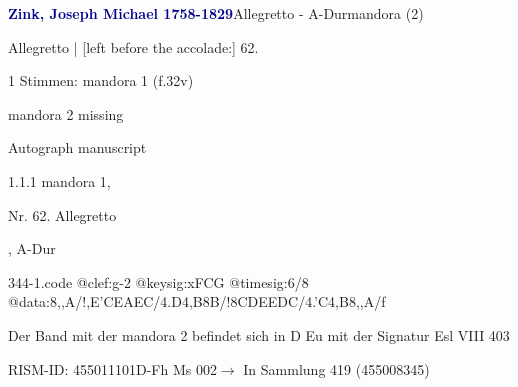 \documentclass[twocolumn]{book}
\begin{document}
\par \vspace{7pt} \textcolor{darkblue}{\textbf{Zink, Joseph Michael  1758-1829}}\hfillplus{\textbf{[344]}}\newline Allegretto - A-Dur\newline mandora (2)
\par \begin{itshape}[f.32v, at left:] Allegretto | [left before the accolade:] 62.\end{itshape} 
\par \textcolor{darkblue}{}  1 Stimmen: mandora 1  (f.32v)\newline \begin{small} mandora 2 missing\end{small} \newline Autograph manuscript
\par 1.1.1  mandora 1, \begin{itshape}Nr. 62. Allegretto\end{itshape}, A-Dur  
\begin{filecontents*}{344-1.code}
@clef:g-2
@keysig:xFCG
@timesig:6/8
@data:8,,A/!,E'CEAEC/4.D4,B8B/!8CDEEDC/4.'C4,B8,,A/f
\end{filecontents*}
\newline
%
\par Der Band mit der mandora 2 befindet sich in D Eu mit der Signatur Esl VIII 403
\par RISM-ID: 455011101\newline D-Fh  Ms 002\newline $\rightarrow$ In Sammlung 419 (455008345)
      
\end{document}
